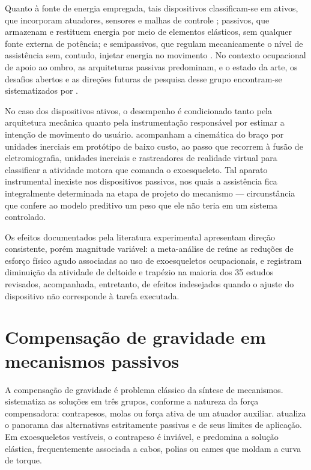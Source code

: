 Quanto à fonte de energia empregada, tais dispositivos classificam-se em ativos, que incorporam atuadores, sensores e malhas de controle \cite{perry2007,rahman2015}; passivos, que armazenam e restituem energia por meio de elementos elásticos, sem qualquer fonte externa de potência; e semipassivos, que regulam mecanicamente o nível de assistência sem, contudo, injetar energia no movimento \cite{grazi2020}. No contexto ocupacional de apoio ao ombro, as arquiteturas passivas predominam, e o estado da arte, os desafios abertos e as direções futuras de pesquisa desse grupo encontram-se sistematizados por \textcite{reyes2023}.

No caso dos dispositivos ativos, o desempenho é condicionado tanto pela arquitetura mecânica quanto pela instrumentação responsável por estimar a intenção de movimento do usuário. \textcite{atia2018} acompanham a cinemática do braço por unidades inerciais em protótipo de baixo custo, ao passo que \textcite{obukhov2025} recorrem à fusão de eletromiografia, unidades inerciais e rastreadores de realidade virtual para classificar a atividade motora que comanda o exoesqueleto. Tal aparato instrumental inexiste nos dispositivos passivos, nos quais a assistência fica integralmente determinada na etapa de projeto do mecanismo — circunstância que confere ao modelo preditivo um peso que ele não teria em um sistema controlado.

Os efeitos documentados pela literatura experimental apresentam direção consistente, porém magnitude variável: a meta-análise de \textcite{bar2021} reúne as reduções de esforço físico agudo associadas ao uso de exoesqueletos ocupacionais, e \textcite{moeller2022} registram diminuição da atividade de deltoide e trapézio na maioria dos 35 estudos revisados, acompanhada, entretanto, de efeitos indesejados quando o ajuste do dispositivo não corresponde à tarefa executada.

\section{Compensação de gravidade em mecanismos passivos}\label{sec:2.3}

A compensação de gravidade é problema clássico da síntese de mecanismos. \textcite{arakelian2016} sistematiza as soluções em três grupos, conforme a natureza da força compensadora: contrapesos, molas ou força ativa de um atuador auxiliar. \textcite{nguyen2026} atualiza o panorama das alternativas estritamente passivas e de seus limites de aplicação. Em exoesqueletos vestíveis, o contrapeso é inviável, e predomina a solução elástica, frequentemente associada a cabos, polias ou cames que moldam a curva de torque.

